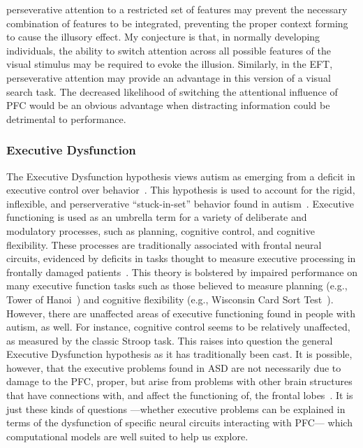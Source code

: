 \documentclass[man]{apa}
\begin{document}
perseverative attention to a restricted set of features may prevent the necessary combination of features to be integrated, preventing the proper context forming to cause the illusory effect.  My conjecture is that, in normally developing individuals, the ability to switch attention across all possible features of the visual stimulus may be required to evoke the illusion.  Similarly, in the EFT, perseverative attention may provide an advantage in this version of a visual search task.  The decreased likelihood of switching the attentional influence of PFC would be an obvious advantage when distracting information could be detrimental to performance.

\subsubsection{Executive Dysfunction}
The Executive Dysfunction hypothesis views autism as emerging from a deficit in executive control over behavior~\cite{HughesC:1994:AutismExecutiveDysfunction,Ozonoff:1991:AutismExecutiveDysfunction}. This hypothesis is used to account for the rigid, inflexible, and perserverative ``stuck-in-set'' behavior found in autism~\cite{HillEL:2004:AutismExecutiveDysfunction}.  Executive functioning is used as an umbrella term for a variety of deliberate and modulatory processes, such as planning, cognitive control, and cognitive flexibility.  These processes are traditionally associated with frontal neural circuits, evidenced by deficits in tasks thought to measure executive processing in frontally damaged patients~\cite{Stuss:2000:WCSTLesion,Stuss:2001:StroopLesion}.  This theory is bolstered by impaired performance on many executive function tasks such as those believed to measure planning (e.g., Tower of Hanoi~\cite{HughesC:1994:AutismExecutiveDysfunction,Ozonoff:1999:AutismStroopWCST}) and cognitive flexibility (e.g., Wisconsin Card Sort Test~\cite{BennettoL:1996:AutismPlanningWCST}).  However, there are unaffected areas of executive functioning found in people with autism, as well.  For instance, cognitive control seems to be relatively unaffected, as measured by the classic Stroop task.  This raises into question the general Executive Dysfunction hypothesis as it has traditionally been cast.  It is possible, however, that the executive problems found in ASD are not necessarily due to damage to the PFC, proper, but arise from problems with other brain structures that have connections with, and affect the functioning of, the frontal lobes~\cite{RobbinsTW:1997:AutismNeurological}.  It is just these kinds of questions ---whether executive problems can be explained in terms of the dysfunction of specific neural circuits interacting with PFC--- which computational models are well suited to help us explore.
\end{document}
